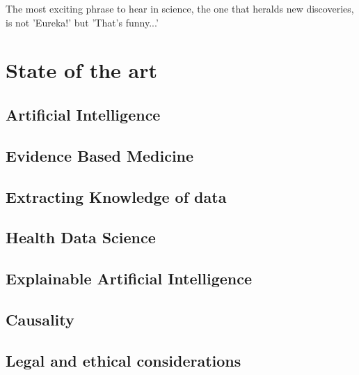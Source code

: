 \begin{savequote}[75mm]
The most exciting phrase to hear in science, the one that heralds new discoveries, is not 'Eureka!' but 'That's funny...'
\end{savequote}

\chapter{State of the art} \label{chap:sota}


\section{Artificial Intelligence}


\section{Evidence Based Medicine}\label{subsec:ebm}




\section{Extracting Knowledge of data}\label{sec:kdd}



\section{Health Data Science}



\section{Explainable Artificial Intelligence}\label{subsec:xai}




\section{Causality}\label{causalml}




\section{Legal and ethical considerations}


